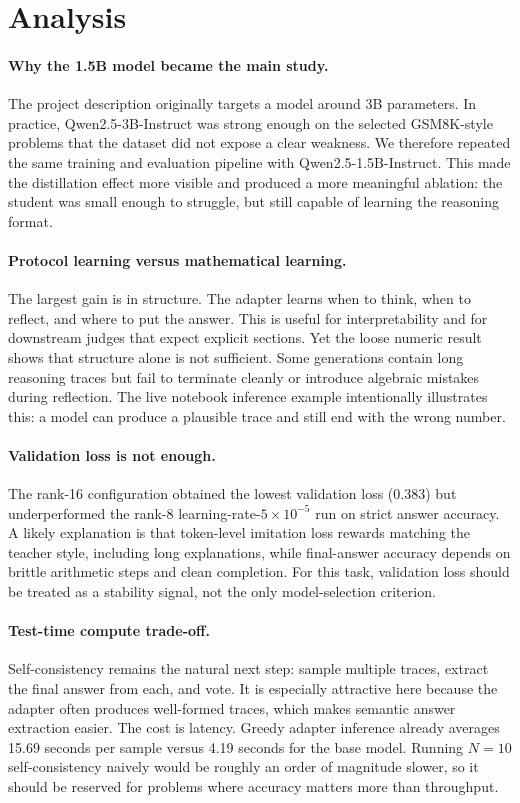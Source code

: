 \documentclass{article}
\begin{document}
\section{Analysis}
\paragraph{Why the 1.5B model became the main study.}
The project description originally targets a model around 3B parameters. In practice, Qwen2.5-3B-Instruct was strong enough on the selected GSM8K-style problems that the dataset did not expose a clear weakness. We therefore repeated the same training and evaluation pipeline with Qwen2.5-1.5B-Instruct. This made the distillation effect more visible and produced a more meaningful ablation: the student was small enough to struggle, but still capable of learning the reasoning format.

\paragraph{Protocol learning versus mathematical learning.}
The largest gain is in structure. The adapter learns when to think, when to reflect, and where to put the answer. This is useful for interpretability and for downstream judges that expect explicit sections. Yet the loose numeric result shows that structure alone is not sufficient. Some generations contain long reasoning traces but fail to terminate cleanly or introduce algebraic mistakes during reflection. The live notebook inference example intentionally illustrates this: a model can produce a plausible trace and still end with the wrong number.

\paragraph{Validation loss is not enough.}
The rank-16 configuration obtained the lowest validation loss (0.383) but underperformed the rank-8 learning-rate-$5\times10^{-5}$ run on strict answer accuracy. A likely explanation is that token-level imitation loss rewards matching the teacher style, including long explanations, while final-answer accuracy depends on brittle arithmetic steps and clean completion. For this task, validation loss should be treated as a stability signal, not the only model-selection criterion.

\paragraph{Test-time compute trade-off.}
Self-consistency remains the natural next step: sample multiple traces, extract the final answer from each, and vote. It is especially attractive here because the adapter often produces well-formed traces, which makes semantic answer extraction easier. The cost is latency. Greedy adapter inference already averages 15.69 seconds per sample versus 4.19 seconds for the base model. Running $N=10$ self-consistency naively would be roughly an order of magnitude slower, so it should be reserved for problems where accuracy matters more than throughput.
\end{document}
